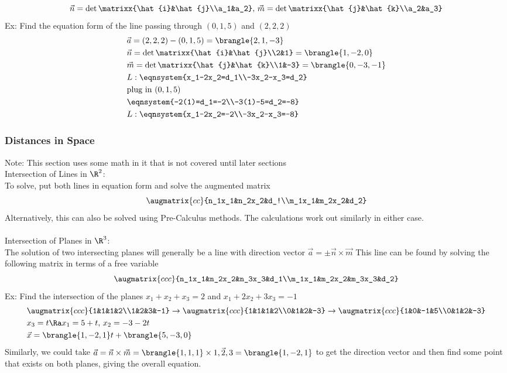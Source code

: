 $$\vec{n}=\det\matrixx{\hat{i}&\hat{j}\\a_1&a_2},\,\vec{m}=\det\matrixx{\hat{j}&\hat{k}\\a_2&a_3}$$
Ex: Find the equation form of the line passing through $(0,1,5)$ and $(2,2,2)$
\begin{align*}
    &\vec{a}=(2,2,2)-(0,1,5)=\brangle{2,1,-3}\\
    &\vec{n}=\det\matrixx{\hat{i}&\hat{j}\\2&1}=\brangle{1,-2,0}\\
    &\vec{m}=\det\matrixx{\hat{j}&\hat{k}\\1&-3}=\brangle{0,-3,-1}\\
    &L:\eqnsystem{x_1-2x_2=d_1\\-3x_2-x_3=d_2}\\
    &\text{plug in }(0,1,5)\\
    &\eqnsystem{-2(1)=d_1=-2\\-3(1)-5=d_2=-8}\\
    &L:\eqnsystem{x_1-2x_2=-2\\-3x_2-x_3=-8}
\end{align*}
\subsubsection{Distances in Space}
Note: This section uses some math in it that is not covered until later sections\\
Intersection of Lines in $\R^2$:\\
To solve, put both lines in equation form and solve the augmented matrix
$$\augmatrix{cc}{n_1x_1&n_2x_2&d_!\\m_1x_1&m_2x_2&d_2}$$
Alternatively, this can also be solved using Pre-Calculus methods. The calculations work out similarly in either case.\\
\\
Intersection of Planes in $\R^3$:\\
The solution of two intersecting planes will generally be a line with direction vector $\vec{a}=\pm\vec{n}\times\vec{m}$
This line can be found by solving the following matrix in terms of a free variable
$$\augmatrix{ccc}{n_1x_1&n_2x_2&n_3x_3&d_1\\m_1x_1&m_2x_2&m_3x_3&d_2}$$
Ex: Find the intersection of the planes $x_1+x_2+x_3=2$ and $x_1+2x_2+3x_3=-1$
\begin{align*}
    &\augmatrix{ccc}{1&1&1&2\\1&2&3&-1}\to\augmatrix{ccc}{1&1&1&2\\0&1&2&-3}\to\augmatrix{ccc}{1&0&-1&5\\0&1&2&-3}\\
    &x_3=t\Ra x_1=5+t,\,x_2=-3-2t\\
    &\vec{x}=\brangle{1,-2,1}t+\brangle{5,-3,0}
\end{align*}
Similarly, we could take $\vec{a}=\vec{n}\times\vec{m}=\brangle{1,1,1}\times\vec{1,2,3}=\brangle{1,-2,1}$ to get the direction vector and then find some point that exists on both planes, giving the overall equation.\\

